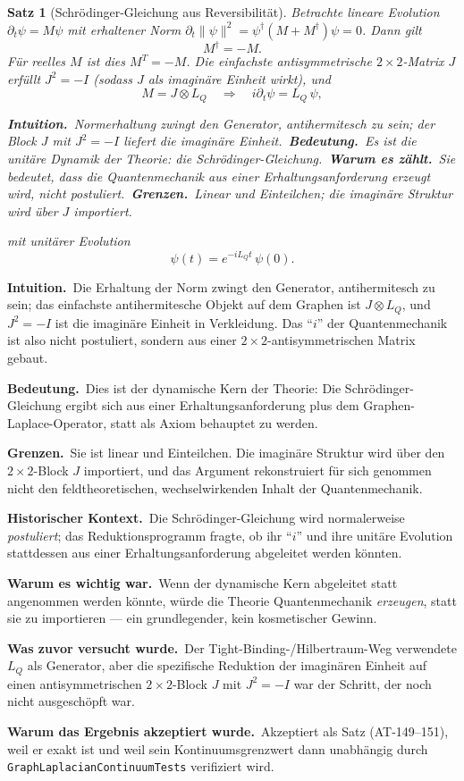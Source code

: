 \documentclass[10pt,twoside,openany]{book}
\newtheorem{theorem}{Satz}[chapter]
\newcommand{\theoremnotes}[3]{%
  \par\medskip\noindent
  \textbf{Intuition.}\ #1\par
  \textbf{Bedeutung.}\ #2\par
  \textbf{Grenzen.}\ #3\par}
\newcommand{\eqnotes}[4]{%
  \par\smallskip\noindent
  \textbf{Intuition.}\ #1\ 
  \textbf{Bedeutung.}\ #2\ 
  \textbf{Warum es zählt.}\ #3\ 
  \textbf{Grenzen.}\ #4\par}
\newcommand{\historynotes}[4]{%
  \par\smallskip\noindent
  \textbf{Historischer Kontext.}\ #1\par
  \textbf{Warum es wichtig war.}\ #2\par
  \textbf{Was zuvor versucht wurde.}\ #3\par
  \textbf{Warum das Ergebnis akzeptiert wurde.}\ #4\par}
\begin{document}
\begin{theorem}[Schr\"odinger-Gleichung aus Reversibilität]
Betrachte lineare Evolution $\partial_t\psi = M\psi$ mit erhaltener Norm
$\partial_t\|\psi\|^2 = \psi^\dagger(M+M^\dagger)\psi = 0$. Dann gilt
\begin{equation}
M^\dagger = -M .
\end{equation}
Für reelles $M$ ist dies $M^T=-M$. Die einfachste antisymmetrische $2\times2$-Matrix $J$
erfüllt $J^2=-I$ (sodass $J$ als imaginäre Einheit wirkt), und
\begin{equation}
M = J\otimes L_Q \quad\Longrightarrow\quad i\partial_t \psi = L_Q\,\psi,
\end{equation}

\eqnotes
{Normerhaltung zwingt den Generator, antihermitesch zu sein; der Block $J$ mit $J^2=-I$
liefert die imaginäre Einheit.}
{Es ist die unitäre Dynamik der Theorie: die Schr\"odinger-Gleichung.}
{Sie bedeutet, dass die Quantenmechanik aus einer Erhaltungsanforderung \emph{erzeugt}
wird, nicht postuliert.}
{Linear und Einteilchen; die imaginäre Struktur wird über $J$ importiert.}
mit unitärer Evolution
\begin{equation}
\psi(t) = e^{-iL_Qt}\,\psi(0).
\end{equation}
\end{theorem}

\theoremnotes
{Die Erhaltung der Norm zwingt den Generator, antihermitesch zu sein; das einfachste
antihermitesche Objekt auf dem Graphen ist $J\otimes L_Q$, und $J^2=-I$ ist die imaginäre
Einheit in Verkleidung. Das ``$i$'' der Quantenmechanik ist also nicht postuliert,
sondern aus einer $2\times2$-antisymmetrischen Matrix gebaut.}
{Dies ist der dynamische Kern der Theorie: Die Schr\"odinger-Gleichung ergibt sich aus
einer Erhaltungsanforderung plus dem Graphen-Laplace-Operator, statt als Axiom behauptet
zu werden.}
{Sie ist linear und Einteilchen. Die imaginäre Struktur wird über den $2\times2$-Block $J$
importiert, und das Argument rekonstruiert für sich genommen nicht den feldtheoretischen,
wechselwirkenden Inhalt der Quantenmechanik.}

\historynotes
{Die Schr\"odinger-Gleichung wird normalerweise \emph{postuliert}; das
Reduktionsprogramm fragte, ob ihr ``$i$'' und ihre unitäre Evolution stattdessen aus
einer Erhaltungsanforderung abgeleitet werden könnten.}
{Wenn der dynamische Kern abgeleitet statt angenommen werden könnte, würde die Theorie
Quantenmechanik \emph{erzeugen}, statt sie zu importieren --- ein grundlegender, kein
kosmetischer Gewinn.}
{Der Tight-Binding-/Hilbertraum-Weg verwendete $L_Q$ als Generator, aber die spezifische
Reduktion der imaginären Einheit auf einen antisymmetrischen $2\times2$-Block $J$ mit
$J^2=-I$ war der Schritt, der noch nicht ausgeschöpft war.}
{Akzeptiert als Satz (AT-149--151), weil er exakt ist und weil sein Kontinuumsgrenzwert
dann unabhängig durch \texttt{GraphLaplacianContinuumTests} verifiziert wird.}
\end{document}

